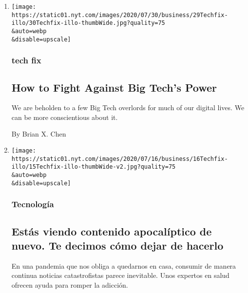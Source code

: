 \begin{enumerate}
\def\labelenumi{\arabic{enumi}.}
\item
  \href{/2020/07/29/technology/personaltech/big-tech-power-how-to-fight.html}{}

  \texttt{[image: https://static01.nyt.com/images/2020/07/30/business/29Techfix-illo/30Techfix-illo-thumbWide.jpg?quality=75\\\&auto=webp\\\&disable=upscale]}

  \hypertarget{tech-fix}{%
  \subsubsection{tech fix}\label{tech-fix}}

  \hypertarget{how-to-fight-against-big-techs-power}{%
  \subsection{How to Fight Against Big Tech's
  Power}\label{how-to-fight-against-big-techs-power}}

  We are beholden to a few Big Tech overlords for much of our digital
  lives. We can be more conscientious about it.

  By Brian X. Chen
\item
  \href{/es/2020/07/22/espanol/negocios/doomscrolling-que-es.html}{}

  \texttt{[image: https://static01.nyt.com/images/2020/07/16/business/16Techfix-illo/15Techfix-illo-thumbWide-v2.jpg?quality=75\\\&auto=webp\\\&disable=upscale]}

  \hypertarget{tecnologuxeda}{%
  \subsubsection{Tecnología}\label{tecnologuxeda}}

  \hypertarget{estuxe1s-viendo-contenido-apocaluxedptico-de-nuevo-te-decimos-cuxf3mo-dejar-de-hacerlo}{%
  \subsection{Estás viendo contenido apocalíptico de nuevo. Te decimos
  cómo dejar de
  hacerlo}\label{estuxe1s-viendo-contenido-apocaluxedptico-de-nuevo-te-decimos-cuxf3mo-dejar-de-hacerlo}}

  En una pandemia que nos obliga a quedarnos en casa, consumir de manera
  continua noticias catastrofistas parece inevitable. Unos expertos en
  salud ofrecen ayuda para romper la adicción.


\end{enumerate}
